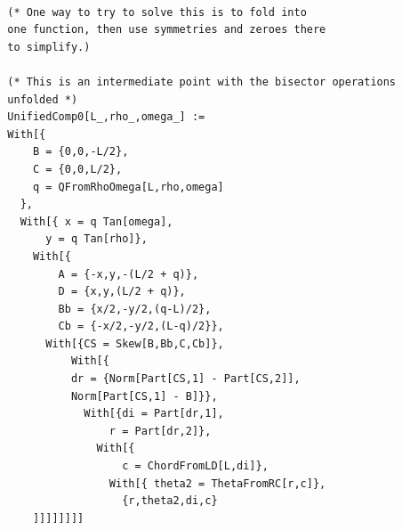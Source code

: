 \documentclass[11pt]{article}
\begin{document}
{\begin{verbatim}
  
  (* One way to try to solve this is to fold into
  one function, then use symmetries and zeroes there
  to simplify.)

  (* This is an intermediate point with the bisector operations
  unfolded *)
  UnifiedComp0[L_,rho_,omega_] :=
  With[{
      B = {0,0,-L/2},
      C = {0,0,L/2},
      q = QFromRhoOmega[L,rho,omega]
    },
    With[{ x = q Tan[omega],
        y = q Tan[rho]},
      With[{
          A = {-x,y,-(L/2 + q)},
          D = {x,y,(L/2 + q)},
          Bb = {x/2,-y/2,(q-L)/2},
          Cb = {-x/2,-y/2,(L-q)/2}},
        With[{CS = Skew[B,Bb,C,Cb]},
            With[{
            dr = {Norm[Part[CS,1] - Part[CS,2]],
            Norm[Part[CS,1] - B]}},
              With[{di = Part[dr,1],
                  r = Part[dr,2]},
                With[{
                    c = ChordFromLD[L,di]},
                  With[{ theta2 = ThetaFromRC[r,c]},
                    {r,theta2,di,c}
      ]]]]]]]]



\end{verbatim}}
\end{document}
